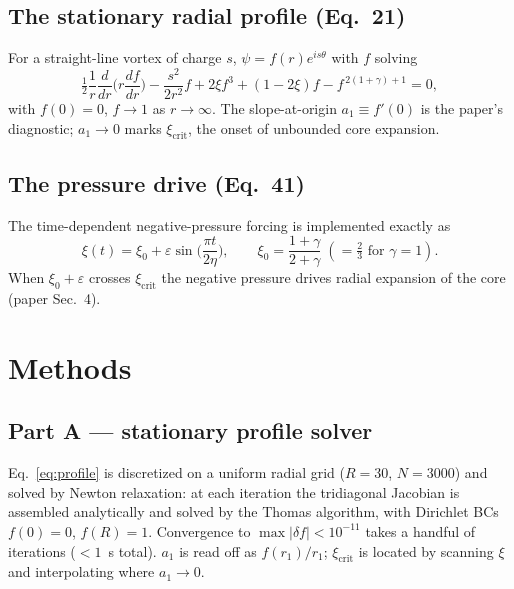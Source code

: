 \documentclass[11pt]{article}
\begin{document}
\subsection{The stationary radial profile (Eq.~21)}
For a straight-line vortex of charge $s$, $\psi=f(r)e^{is\theta}$ with $f$ solving
\begin{equation}
  \tfrac{1}{2}\frac{1}{r}\frac{d}{dr}\!\Big(r\frac{df}{dr}\Big)
  - \frac{s^2}{2r^2}f + 2\xi f^3 + (1-2\xi)f - f^{\,2(1+\gamma)+1} = 0,
  \label{eq:profile}
\end{equation}
with $f(0)=0$, $f\to1$ as $r\to\infty$. The slope-at-origin
$a_1 \equiv f'(0)$ is the paper's diagnostic; $a_1\to0$ marks
$\xi_{\mathrm{crit}}$, the onset of unbounded core expansion.

\subsection{The pressure drive (Eq.~41)}
The time-dependent negative-pressure forcing is implemented exactly as
\begin{equation}
  \xi(t) = \xi_0 + \varepsilon\sin\!\Big(\frac{\pi t}{2\eta}\Big),
  \qquad \xi_0 = \frac{1+\gamma}{2+\gamma}\;(=\tfrac{2}{3}\text{ for }\gamma=1).
  \label{eq:drive}
\end{equation}
When $\xi_0+\varepsilon$ crosses $\xi_{\mathrm{crit}}$ the negative pressure
drives radial expansion of the core (paper Sec.~4).

\section{Methods}
\subsection{Part A --- stationary profile solver}
Eq.~\eqref{eq:profile} is discretized on a uniform radial grid
($R=30$, $N=3000$) and solved by Newton relaxation: at each iteration the
tridiagonal Jacobian is assembled analytically and solved by the Thomas
algorithm, with Dirichlet BCs $f(0)=0$, $f(R)=1$. Convergence to
$\max|\delta f|<10^{-11}$ takes a handful of iterations ($<1$~s total). $a_1$ is
read off as $f(r_1)/r_1$; $\xi_{\mathrm{crit}}$ is located by scanning $\xi$ and
interpolating where $a_1\to0$.
\end{document}
